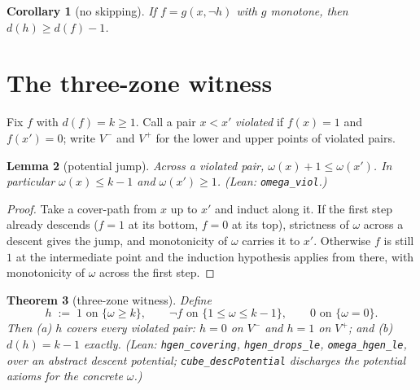 \documentclass[11pt]{article}
\newtheorem{theorem}{Theorem}[section]
\newtheorem{lemma}[theorem]{Lemma}
\newtheorem{corollary}[theorem]{Corollary}
\theoremstyle{remark}
\begin{document}
\begin{corollary}[no skipping]\label{cor:noskip}
If $f=g(x,\neg h)$ with $g$ monotone, then $d(h)\ge d(f)-1$.
\end{corollary}

\section{The three-zone witness}\label{sec:witness}

Fix $f$ with $d(f)=k\ge 1$. Call a pair $x<x'$ \emph{violated} if $f(x)=1$
and $f(x')=0$; write $V^-$ and $V^+$ for the lower and upper points of
violated pairs.

\begin{lemma}[potential jump]\label{lem:jump}
Across a violated pair, $\omega(x)+1\le\omega(x')$. In particular
$\omega(x)\le k-1$ and $\omega(x')\ge 1$. (Lean: \texttt{omega\_viol}.)
\end{lemma}

\begin{proof}
Take a cover-path from $x$ up to $x'$ and induct along it. If the first
step already descends ($f=1$ at its bottom, $f=0$ at its top), strictness of
$\omega$ across a descent gives the jump, and monotonicity of $\omega$
carries it to $x'$. Otherwise $f$ is still $1$ at the intermediate point and
the induction hypothesis applies from there, with monotonicity of $\omega$
across the first step.
\end{proof}

\begin{theorem}[three-zone witness]\label{thm:witness}
Define
\[
h\;:=\;1 \text{ on } \{\omega\ge k\},\qquad
\neg f \text{ on } \{1\le\omega\le k-1\},\qquad
0 \text{ on } \{\omega=0\}.
\]
Then \textup{(a)} $h$ covers every violated pair: $h=0$ on $V^-$ and $h=1$
on $V^+$; and \textup{(b)} $d(h)=k-1$ exactly. (Lean:
\texttt{hgen\_covering}, \texttt{hgen\_drops\_le}, \texttt{omega\_hgen\_le},
over an abstract descent potential; \texttt{cube\_descPotential} discharges
the potential axioms for the concrete $\omega$.)
\end{theorem}
\end{document}
